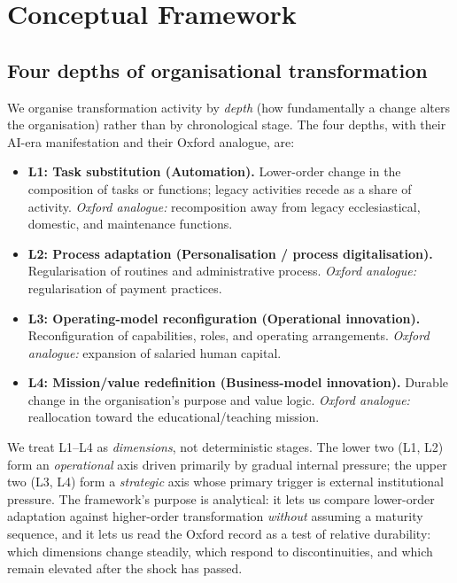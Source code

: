 \documentclass[11pt]{article}
\begin{document}
\section{Conceptual Framework}
\label{sec:framework}

\subsection{Four depths of organisational transformation}

We organise transformation activity by \emph{depth} (how fundamentally a change alters the
organisation) rather than by chronological stage. The four depths, with their AI-era
manifestation and their Oxford analogue, are:

\begin{itemize}
\item \textbf{L1: Task substitution (Automation).} Lower-order change in the composition of
tasks or functions; legacy activities recede as a share of activity. \emph{Oxford analogue:}
recomposition away from legacy ecclesiastical, domestic, and maintenance functions.
\item \textbf{L2: Process adaptation (Personalisation / process digitalisation).}
Regularisation of routines and administrative process. \emph{Oxford analogue:} regularisation of
payment practices.
\item \textbf{L3: Operating-model reconfiguration (Operational innovation).} Reconfiguration
of capabilities, roles, and operating arrangements. \emph{Oxford analogue:} expansion of
salaried human capital.
\item \textbf{L4: Mission/value redefinition (Business-model innovation).} Durable change in
the organisation's purpose and value logic. \emph{Oxford analogue:} reallocation toward the
educational/teaching mission.
\end{itemize}

We treat L1--L4 as \emph{dimensions}, not deterministic stages. The lower two (L1, L2) form an
\emph{operational} axis driven primarily by gradual internal pressure; the upper two (L3, L4)
form a \emph{strategic} axis whose primary trigger is external institutional pressure. The
framework's purpose is analytical: it lets us compare lower-order adaptation against
higher-order transformation \emph{without} assuming a maturity sequence, and it lets us read the
Oxford record as a test of relative durability: which dimensions change steadily, which
respond to discontinuities, and which remain elevated after the shock has passed.
\end{document}
